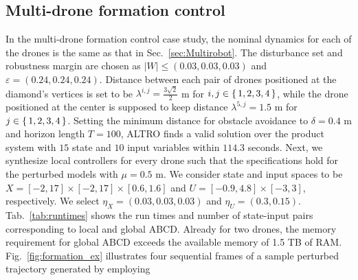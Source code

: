 \subsection{Multi-drone formation control}
\label{sec:formation_control}

In the multi-drone formation control case study, the nominal dynamics for each of the drones is the same as that in 
Sec.~\ref{sec:Multirobot}. 
The disturbance set and robustness margin are chosen as $|W|\leq (0.03,0.03,0.03)$ and $\varepsilon=(0.24,0.24,0.24)$. 
Distance between each pair of drones positioned at the diamond's vertices is set to be $\lambda^{i,j}=\frac{3\sqrt{2}}{2} $ m 
for $i,j\in\set{1,2,3,4}$, while the drone positioned at the center is supposed to keep distance $\lambda^{5,j}=1.5$ m 
for $j\in\set{1,2,3,4}$. 
Setting the minimum distance for obstacle avoidance to $\delta=0.4$ m and horizon length $T=100$, 
ALTRO finds a valid solution over the product system with $15$ state and $10$ input variables within $114.3$ seconds.
Next, we synthesize local controllers for every drone such that the specifications hold for the perturbed models with $\mu=0.5$ m. %
We consider state and input spaces to be $X=[-2,17]\times[-2,17]\times[0.6,1.6]$ and
$U=[-0.9,4.8]\times[-3,3]$, respectively. We select $\eta_{X}=(0.03,0.03,0.03)$ and
$\eta_{U}=(0.3,0.15)$. %
Tab.~\ref{tab:runtimes} shows the run times and number of state-input pairs corresponding to local and global ABCD. 
Already for two drones, the memory requirement for global ABCD exceeds the available memory of 1.5 TB of RAM.
Fig.~\ref{fig:formation_ex} illustrates four sequential frames of a sample perturbed trajectory generated by employing 
